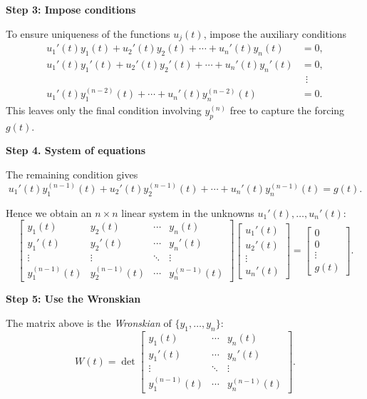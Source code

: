   \textbf{Step 3: Impose conditions}
  
  To ensure uniqueness of the functions $u_{j}(t)$, impose the auxiliary conditions
  \[
    \begin{aligned}
      u_{1}'(t)y_{1}(t) + u_{2}'(t)y_{2}(t) + \cdots + u_{n}'(t)y_{n}(t) &= 0, \\
      u_{1}'(t)y_{1}'(t) + u_{2}'(t)y_{2}'(t) + \cdots + u_{n}'(t)y_{n}'(t) &= 0, \\
      &\ \ \vdots \\
      u_{1}'(t)y_{1}^{(n-2)}(t) + \cdots + u_{n}'(t)y_{n}^{(n-2)}(t) &= 0.
    \end{aligned}
  \]
  This leaves only the final condition involving $y_{p}^{(n)}$ free to capture the forcing $g(t)$.

  \textbf{Step 4. System of equations}
  
  The remaining condition gives
  \[
    u_{1}'(t)y_{1}^{(n-1)}(t) + u_{2}'(t)y_{2}^{(n-1)}(t) + \cdots + u_{n}'(t)y_{n}^{(n-1)}(t) = g(t).
  \]

  Hence we obtain an $n \times n$ linear system in the unknowns $u_{1}'(t), \ldots, u_{n}'(t)$:
  \[
    \begin{bmatrix}
    y_{1}(t) & y_{2}(t) & \cdots & y_{n}(t) \\
    y_{1}'(t) & y_{2}'(t) & \cdots & y_{n}'(t) \\
    \vdots & \vdots & \ddots & \vdots \\
    y_{1}^{(n-1)}(t) & y_{2}^{(n-1)}(t) & \cdots & y_{n}^{(n-1)}(t)
    \end{bmatrix}
    \begin{bmatrix}
    u_{1}'(t) \\ u_{2}'(t) \\ \vdots \\ u_{n}'(t)
    \end{bmatrix}
    =
    \begin{bmatrix}
    0 \\ 0 \\ \vdots \\ g(t)
    \end{bmatrix}.
  \]

  \textbf{Step 5: Use the Wronskian}
  
  The matrix above is the \emph{Wronskian} of $\{y_{1},\ldots,y_{n}\}$:
  \[
    W(t) = \det\!\begin{bmatrix}
    y_{1}(t) & \cdots & y_{n}(t) \\
    y_{1}'(t) & \cdots & y_{n}'(t) \\
    \vdots & \ddots & \vdots \\
    y_{1}^{(n-1)}(t) & \cdots & y_{n}^{(n-1)}(t)
    \end{bmatrix}.
  \]
  
